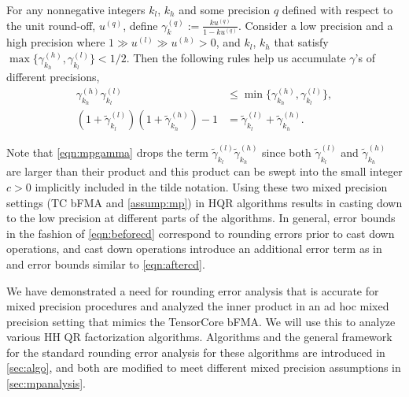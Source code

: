 \documentclass[review,onefignum,onetabnum]{siamart190516}
\begin{document}
\begin{lemma}\label{lem:mp}
	For any nonnegative integers $k_l$, $k_h$ and some precision $q$ defined with respect to the unit round-off, $u^{(q)}$, define $\gamma^{(q)}_{k} := \frac{k u^{(q)} }{1-ku^{(q)}}$.
	Consider a low precision and a high precision where $1 \gg u^{(l)} \gg u^{(h)}>0$, and $k_l$, $k_h$ that satisfy $\max\{\gamma^{(h)}_{k_{h}},\gamma^{(l)}_{k_{l}}\} < 1/2$.
	Then the following rules help us accumulate $\gamma$'s of different precisions,
	\begin{align}
	\gamma^{(h)}_{k_{h}}\gamma^{(l)}_{k_{l}} &\leq \min\{\gamma^{(h)}_{k_{h}},\gamma^{(l)}_{k_{l}} \},\\ 
	(1+\tilde{\gamma}_{k_l}^{(l)})(1+\tilde{\gamma}_{k_h}^{(h)}) -1 &= \tilde{\gamma}_{k_l}^{(l)}+\tilde{\gamma}_{k_h}^{(h)}. \label{eqn:mpgamma}
	\end{align}
\end{lemma}
Note that \cref{eqn:mpgamma} drops the term $\tilde{\gamma}_{k_l}^{(l)}\tilde{\gamma}_{k_h}^{(h)}$ since both $\tilde{\gamma}_{k_l}^{(l)}$ and $\tilde{\gamma}_{k_h}^{(h)}$ are larger than their product and this product can be swept into the small integer $c > 0$ implicitly included in the tilde notation.
Using these two mixed precision settings (TC bFMA and \ref{assump:mp}) in HQR algorithms results in casting down to the low precision at different parts of the algorithms.
In general, error bounds in the fashion of \cref{eqn:beforecd} correspond to rounding errors prior to cast down operations, and cast down operations introduce an additional error term as in and error bounds similar to \cref{eqn:aftercd}.\par

We have demonstrated a need for rounding error analysis that is accurate for mixed precision procedures and analyzed the inner product in an ad hoc mixed precision setting that mimics the TensorCore bFMA.
We will use this to analyze various HH QR factorization algorithms.
Algorithms and the general framework for the standard rounding error analysis for these algorithms are introduced in \cref{sec:algo}, and both are modified to meet different mixed precision assumptions in \cref{sec:mpanalysis}.
\end{document}
